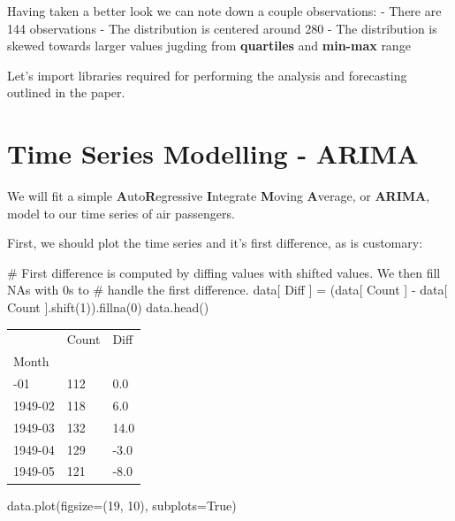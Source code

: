 \documentclass[
  letterpaper,
  DIV=11,
  numbers=noendperiod]{scrartcl}
\newenvironment{Shaded}{\begin{snugshade}}{\end{snugshade}}
\newcommand{\CommentTok}[1]{\textcolor[rgb]{0.37,0.37,0.37}{#1}}
\newcommand{\DecValTok}[1]{\textcolor[rgb]{0.68,0.00,0.00}{#1}}
\newcommand{\NormalTok}[1]{\textcolor[rgb]{0.00,0.23,0.31}{#1}}
\newcommand{\OperatorTok}[1]{\textcolor[rgb]{0.37,0.37,0.37}{#1}}
\newcommand{\StringTok}[1]{\textcolor[rgb]{0.13,0.47,0.30}{#1}}
\newcommand{\VariableTok}[1]{\textcolor[rgb]{0.07,0.07,0.07}{#1}}
\begin{document}
Having taken a better look we can note down a couple observations: -
There are 144 observations - The distribution is centered around 280 -
The distribution is skewed towards larger values jugding from
\textbf{quartiles} and \textbf{min-max} range

Let's import libraries required for performing the analysis and
forecasting outlined in the paper.

\hypertarget{time-series-modelling---arima}{%
\section{Time Series Modelling -
ARIMA}\label{time-series-modelling---arima}}

We will fit a simple \textbf{A}uto\textbf{R}egressive \textbf{I}ntegrate
\textbf{M}oving \textbf{A}verage, or \textbf{ARIMA}, model to our time
series of air passengers.

First, we should plot the time series and it's first difference, as is
customary:

\begin{Shaded}
\begin{Highlighting}[]
\CommentTok{\# First difference is computed by diffing values with shifted values. We then fill NAs with 0s to}
\CommentTok{\# handle the first difference.}
\NormalTok{data[ }\StringTok{\textquotesingle{}Diff\textquotesingle{}}\NormalTok{ ] }\OperatorTok{=}\NormalTok{ (data[ }\StringTok{\textquotesingle{}Count\textquotesingle{}}\NormalTok{ ] }\OperatorTok{{-}}\NormalTok{ data[ }\StringTok{\textquotesingle{}Count\textquotesingle{}}\NormalTok{ ].shift(}\DecValTok{1}\NormalTok{)).fillna(}\DecValTok{0}\NormalTok{)}
\NormalTok{data.head()}
\end{Highlighting}
\end{Shaded}

\begin{longtable}[]{@{}lll@{}}
\toprule\noalign{}
& Count & Diff \\
Month & & \\
\midrule\noalign{}
\endhead
\bottomrule\noalign{}
\endlastfoot
1949-01 & 112 & 0.0 \\
1949-02 & 118 & 6.0 \\
1949-03 & 132 & 14.0 \\
1949-04 & 129 & -3.0 \\
1949-05 & 121 & -8.0 \\
\end{longtable}

\begin{Shaded}
\begin{Highlighting}[]
\NormalTok{data.plot(figsize}\OperatorTok{=}\NormalTok{(}\DecValTok{19}\NormalTok{, }\DecValTok{10}\NormalTok{), subplots}\OperatorTok{=}\VariableTok{True}\NormalTok{)}
\end{Highlighting}
\end{Shaded}
\end{document}
